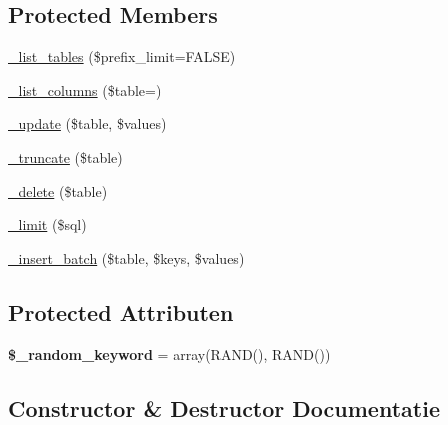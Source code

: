 \subsection*{Protected Members}
\begin{DoxyCompactItemize}
\item 
\mbox{\hyperlink{class_c_i___d_b__pdo__firebird__driver_a435c0f3ce54fe7daa178baa8532ebd54}{\+\_\+list\+\_\+tables}} (\$prefix\+\_\+limit=F\+A\+L\+SE)
\item 
\mbox{\hyperlink{class_c_i___d_b__pdo__firebird__driver_a7ccb7f9c301fe7f0a9db701254142b63}{\+\_\+list\+\_\+columns}} (\$table=\textquotesingle{}\textquotesingle{})
\item 
\mbox{\hyperlink{class_c_i___d_b__pdo__firebird__driver_a2540b03a93fa73ae74c10d0e16fc073e}{\+\_\+update}} (\$table, \$values)
\item 
\mbox{\hyperlink{class_c_i___d_b__pdo__firebird__driver_aa029600528fc1ce660a23ff4b4667f95}{\+\_\+truncate}} (\$table)
\item 
\mbox{\hyperlink{class_c_i___d_b__pdo__firebird__driver_a133ea8446ded52589bd22cc9163d0896}{\+\_\+delete}} (\$table)
\item 
\mbox{\hyperlink{class_c_i___d_b__pdo__firebird__driver_a3a02ea06541b8ecc25a33a61651562c8}{\+\_\+limit}} (\$sql)
\item 
\mbox{\hyperlink{class_c_i___d_b__pdo__firebird__driver_a1978e1358c812587a46e242630365099}{\+\_\+insert\+\_\+batch}} (\$table, \$keys, \$values)
\end{DoxyCompactItemize}
\subsection*{Protected Attributen}
\begin{DoxyCompactItemize}
\item 
\mbox{\label{class_c_i___d_b__pdo__firebird__driver_a10213aa6e05f6d924d3277bb1d2fea00}} 
{\bfseries \$\+\_\+random\+\_\+keyword} = array(\textquotesingle{}R\+A\+ND()\textquotesingle{}, \textquotesingle{}R\+A\+ND()\textquotesingle{})
\end{DoxyCompactItemize}


\subsection{Constructor \& Destructor Documentatie}
\mbox{\label{class_c_i___d_b__pdo__firebird__driver_a9162320adff1a1a4afd7f2372f753a3e}} 
